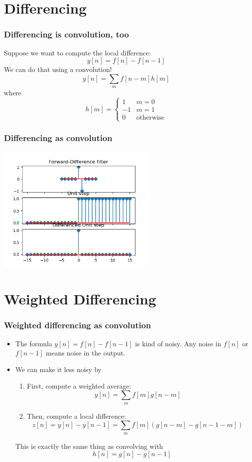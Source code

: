 \documentclass{beamer}
\begin{document}
\section[Differencing]{Differencing}
\setcounter{subsection}{1}

\begin{frame}
  \frametitle{Differencing is convolution, too}

  Suppose we want to compute the local difference:
  \[
  y[n] = f[n] - f[n-1]
  \]
  We can do that using a convolution!
  \[
  y[n] = \sum_m f[n-m]h[m]
  \]
  where
  \[
  h[m] = \begin{cases}
    1 & m=0\\
    -1 & m=1\\
    0 & \mbox{otherwise}
  \end{cases}
  \]
\end{frame}

\begin{frame}
  \frametitle{Differencing as convolution} 
  \centerline{\includegraphics[height=2.5in]{mp3fig5.png}}
\end{frame}
  
\section[Weighted]{Weighted Differencing}
\setcounter{subsection}{1}

\begin{frame}
  \frametitle{Weighted differencing as convolution}
  \begin{itemize}
    \item 
      The formula $y[n]=f[n]-f[n-1]$ is kind of noisy.  Any noise in
      $f[n]$ or $f[n-1]$ means noise in the output.
    \item
      We can make it less noisy  by
      \begin{enumerate}
      \item First, compute a weighted average:
        \[
        y[n] = \sum_m f[m]g[n-m]
        \]
      \item Then, compute a local difference:
        \[
        z[n] = y[n] - y[n-1] = \sum_m f[m]\left(g[n-m]-g[n-1-m]\right)
        \]
      \end{enumerate}
      This is exactly the same thing as convolving with
      \[
      h[n] = g[n]-g[n-1]
      \]
  \end{itemize}
\end{frame}
\end{document}
